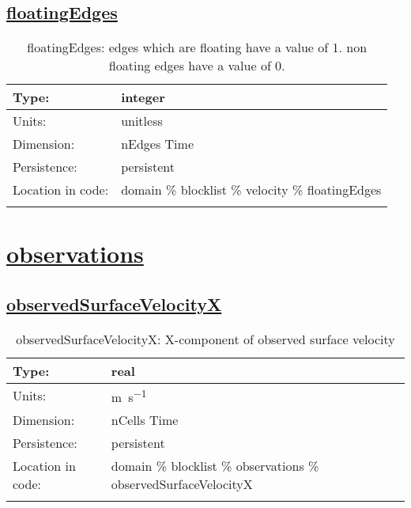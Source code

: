\subsection[floatingEdges]{\hyperref[sec:var_tab_velocity]{floatingEdges}}
\label{subsec:var_sec_velocity_floatingEdges}
\begin{center}
\begin{longtable}{| p{2.0in} | p{4.0in} |}
        \hline 
        Type: & integer \\
        \hline 
        Units: & \si{unitless} \\
        \hline 
        Dimension: & nEdges Time \\
        \hline 
        Persistence: & persistent \\
        \hline 
         Location in code: & domain \% blocklist \% velocity \% floatingEdges \\
         \hline 
    \caption{floatingEdges: edges which are floating have a value of 1.  non floating edges have a value of 0.}
\end{longtable}
\end{center}
\section[observations]{\hyperref[sec:var_tab_observations]{observations}}
\label{sec:var_sec_observations}
\subsection[observedSurfaceVelocityX]{\hyperref[sec:var_tab_observations]{observedSurfaceVelocityX}}
\label{subsec:var_sec_observations_observedSurfaceVelocityX}
\begin{center}
\begin{longtable}{| p{2.0in} | p{4.0in} |}
        \hline 
        Type: & real \\
        \hline 
        Units: & \si{m.s^{-1}} \\
        \hline 
        Dimension: & nCells Time \\
        \hline 
        Persistence: & persistent \\
        \hline 
         Location in code: & domain \% blocklist \% observations \% observedSurfaceVelocityX \\
         \hline 
    \caption{observedSurfaceVelocityX: X-component of observed surface velocity}
\end{longtable}
\end{center}

